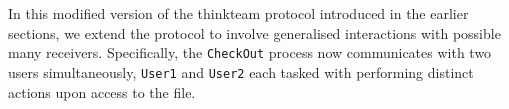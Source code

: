 \begin{comment}
{
GraphConnected0 := 
	PC -> M[i] : (+["1*p"] " " "(varM[i]'=true)". END
		        +["1*(1-p)"] " " "(varM[i]'=false)". END)
	PC -> P[i] : (+["1*p"] " " "(varP[i]'=true)" . END
		        +["1*(1-p)"] " " "(varP[i]'=false)".
			if "(PC=6)&!varP[i]&((varP[i] & varM[i]) | (varM[i+1] & varP[i+2])) "@P[i] then {
				["1"]"(varP[i]'=true)"@P[i] . GraphConnected0
			}) 								  
}
\end{lstlisting}
\begin{lstlisting}[style=prism-color,caption={Generated PRISM program for the Random Graphs
	Protocol.},captionpos=b,label={ex4-gen}]
mdp
const double p;
	
module PC
   PC : [0..7] init 0;
	
   [DPPGR] (PC=0)  $\rightarrow$ 1 :  (PC'=1); 
   [YCJJG] (PC=1)  $\rightarrow$ 1 :  (PC'=2); 
   [TWGVA] (PC=2)  $\rightarrow$ 1 :  (PC'=3); 
   [NODPZ] (PC=3)  $\rightarrow$ 1 :  (PC'=4); 
   [FDALJ] (PC=4)  $\rightarrow$ 1 :  (PC'=5); 
   [DCKXC] (PC=5)  $\rightarrow$ 1 :  (PC'=6); 
endmodule

module M1
   M1 : [0..1] init 0;
   varM1 : bool; 

   [DPPGR] (M1=0)  $\rightarrow$ p :(varM1'=true)$\&$(M1'=0) + (1-p) :(varM1'=false)$\&$(M1'=0); 
endmodule	

$\ldots$

module P1
   P1 : [0..3] init 0;
   varP1 : bool; 

   [NODPZ] (P1=0)  $\rightarrow$ p:(varP1'=true)$\&$(P1'=0) + (1-p):(varP1'=false)$\&$(P1'=0); 
   [] (P1=0)$\&$(PC=6)$\&$!varP1&((varP1 $\&$ varM1) | (varM2$\&$ varP3))  
   				$\rightarrow$ 1 : (varP1'=true)$\&$(P1'=0); 
endmodule
$\ldots$
\end{lstlisting}

The model is very similar to the one presented in the PRISM repository, the main difference is that we use state variables also for the modules \texttt{P$_i$} and \texttt{M$_i$}, 
where in the original model they were not requires.
However, this does not affect the behaviour of the model, as the reader can notice from the results of the probability that nodes 1 and 2 are connected showed in Figure \ref{ex4-res}.
\begin{figure}[h]
\centering
\texttt{[image: example5-results.jpeg]}	
\caption{Probability that the nodes 1 and 2 are connected.}
\label{ex4-res}
\end{figure}
\end{comment}


In this modified version of the thinkteam protocol introduced in the earlier sections, we extend the protocol to involve generalised interactions with possible many receivers. Specifically, the \texttt{CheckOut} process now communicates with two users simultaneously, \texttt{User1} and \texttt{User2} each tasked with performing distinct actions upon access to the file. 

